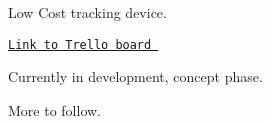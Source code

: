 Low Cost tracking device.

\href{https://trello.com/b/kybOiZbr}{\tt Link to Trello board }

Currently in development, concept phase.

More to follow. 